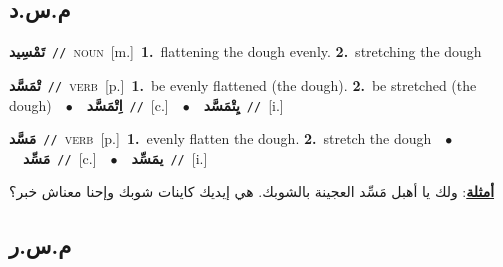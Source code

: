 \documentclass[10pt,a4paper,twoside]{article} %
\begin{document}
\begin{multicols}{2}
\vspace{-3mm}
\subsection*{\color{blue}\foreignlanguage{arabic}{م.س.د}\color{blue}{}} 

{\setlength\topsep{0pt}\textbf{\foreignlanguage{arabic}{تَمْسِيد}}\ {\color{gray}\texttt{//}\color{black}}\ \textsc{noun}\ [m.]\ \textbf{1.}~flattening the dough evenly.  \textbf{2.}~stretching the dough\ } \vspace{2mm}

{\setlength\topsep{0pt}\textbf{\foreignlanguage{arabic}{تْمَسَّد}}\ {\color{gray}\texttt{//}\color{black}}\ \textsc{verb}\ [p.]\ \textbf{1.}~be evenly flattened (the dough).  \textbf{2.}~be stretched (the dough)\ \ $\bullet$\ \ \setlength\topsep{0pt}\textbf{\foreignlanguage{arabic}{اِتْمَسَّد}}\ {\color{gray}\texttt{//}\color{black}}\ [c.]\ \ $\bullet$\ \ \setlength\topsep{0pt}\textbf{\foreignlanguage{arabic}{يِتْمَسَّد}}\ {\color{gray}\texttt{//}\color{black}}\ [i.]\ } \vspace{2mm}

{\setlength\topsep{0pt}\textbf{\foreignlanguage{arabic}{مَسَّد}}\ {\color{gray}\texttt{//}\color{black}}\ \textsc{verb}\ [p.]\ \textbf{1.}~evenly flatten the dough.  \textbf{2.}~stretch the dough\ \ $\bullet$\ \ \setlength\topsep{0pt}\textbf{\foreignlanguage{arabic}{مَسِّد}}\ {\color{gray}\texttt{//}\color{black}}\ [c.]\ \ $\bullet$\ \ \setlength\topsep{0pt}\textbf{\foreignlanguage{arabic}{يمَسِّد}}\ {\color{gray}\texttt{//}\color{black}}\ [i.]\  \begin{flushright}\color{gray}\foreignlanguage{arabic}{\textbf{\underline{\foreignlanguage{arabic}{أمثلة}}}: ولك يا أهبل مَسِّد العجينة بالشوبك. هي إيديك كاينات شوبك وإحنا معناش خبر؟}\end{flushright}\color{black}} \vspace{2mm}

\vspace{-3mm}
\subsection*{\color{blue}\foreignlanguage{arabic}{م.س.ر}\color{blue}{}} 


\end{multicols}
\end{document}
